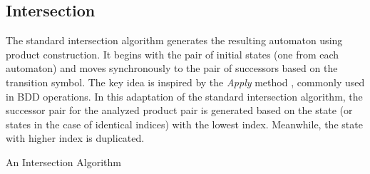 \documentclass[pdflatex,sn-mathphys-num]{sn-jnl}%
\theoremstyle{thmstyleone}%
\theoremstyle{thmstyletwo}%
\theoremstyle{thmstylethree}%
\begin{document}
    \subsection{Intersection}
        The standard intersection algorithm generates the resulting automaton using product construction. It begins with the pair of initial states (one from each automaton) and moves synchronously to the pair of successors based on the transition symbol. The key idea is inspired by the \textit{Apply} method \cite{APPLY}, commonly used in BDD operations. In this adaptation of the standard intersection algorithm, the successor pair for the analyzed product pair is generated based on the state (or states in the case of identical indices) with the lowest index. Meanwhile, the state with higher index is duplicated.

        \begin{algorithm}
            \caption{An Intersection Algorithm}
            \small
            \DontPrintSemicolon

            \vspace*{0.5em}


            \vspace*{0.5em}



\end{algorithm}
\end{document}

